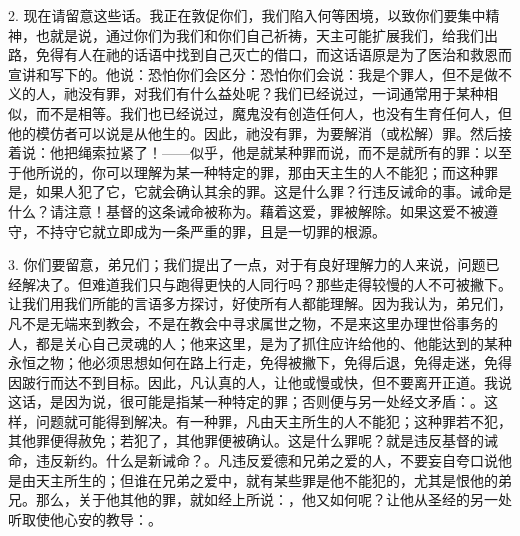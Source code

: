 2. 现在请留意这些话。我正在敦促你们，我们陷入何等困境，以致你们要集中精神，也就是说，通过你们为我们和你们自己祈祷，天主可能扩展我们，给我们出路，免得有人在祂的话语中找到自己灭亡的借口，而这话语原是为了医治和救恩而宣讲和写下的。他说：恐怕你们会区分：恐怕你们会说：我是个罪人，但不是做不义的人，祂没有罪，对我们有什么益处呢？我们已经说过，一词通常用于某种相似，而不是相等。我们也已经说过，魔鬼没有创造任何人，也没有生育任何人，但他的模仿者可以说是从他生的。因此，祂没有罪，为要解消（或松解）罪。然后接着说：他把绳索拉紧了！——似乎，他是就某种罪而说，而不是就所有的罪：以至于他所说的，你可以理解为某一种特定的罪，那由天主生的人不能犯；而这种罪是，如果人犯了它，它就会确认其余的罪。这是什么罪？行违反诫命的事。诫命是什么？请注意！基督的这条诫命被称为。藉着这爱，罪被解除。如果这爱不被遵守，不持守它就立即成为一条严重的罪，且是一切罪的根源。\par

3. 你们要留意，弟兄们；我们提出了一点，对于有良好理解力的人来说，问题已经解决了。但难道我们只与跑得更快的人同行吗？那些走得较慢的人不可被撇下。让我们用我们所能的言语多方探讨，好使所有人都能理解。因为我认为，弟兄们，凡不是无端来到教会，不是在教会中寻求属世之物，不是来这里办理世俗事务的人，都是关心自己灵魂的人；他来这里，是为了抓住应许给他的、他能达到的某种永恒之物；他必须思想如何在路上行走，免得被撇下，免得后退，免得走迷，免得因跛行而达不到目标。因此，凡认真的人，让他或慢或快，但不要离开正道。我说这话，是因为说，很可能是指某一种特定的罪；否则便与另一处经文矛盾：。这样，问题就可能得到解决。有一种罪，凡由天主所生的人不能犯；这种罪若不犯，其他罪便得赦免；若犯了，其他罪便被确认。这是什么罪呢？就是违反基督的诫命，违反新约。什么是新诫命？。凡违反爱德和兄弟之爱的人，不要妄自夸口说他是由天主所生的；但谁在兄弟之爱中，就有某些罪是他不能犯的，尤其是恨他的弟兄。那么，关于他其他的罪，就如经上所说：，他又如何呢？让他从圣经的另一处听取使他心安的教导：。\par

